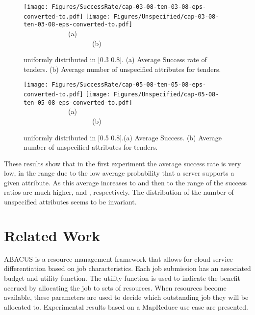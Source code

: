 \documentclass[10pt, conference, compsocconf]{IEEEtran}
\begin{document}
\begin{figure*}[p]
\begin{center}
\texttt{[image: Figures/SuccessRate/cap-03-08-ten-03-08-eps-converted-to.pdf]}
\texttt{[image: Figures/Unspecified/cap-03-08-ten-03-08-eps-converted-to.pdf]}\\
~~~~~~~~~~~~~(a)~~~~~~~~~~~~~~~~~~~~~~~~~~~~~~~~~~~~~~~~~~~~~~~~~~~~~~~~~~~~~~~~~(b)
\end{center}
\caption{ uniformly distributed in [0.3 0.8]. (a) Average Success rate of tenders. (b) Average number of unspecified attributes for tenders.}
\label{0308}
\end{figure*}



\begin{figure*}[p]
\begin{center}
\texttt{[image: Figures/SuccessRate/cap-05-08-ten-05-08-eps-converted-to.pdf]}
\texttt{[image: Figures/Unspecified/cap-05-08-ten-05-08-eps-converted-to.pdf]}\\
~~~~~~~~~~~~~(a)~~~~~~~~~~~~~~~~~~~~~~~~~~~~~~~~~~~~~~~~~~~~~~~~~~~~~~~~~~~~~~~~~(b)
\end{center}
\caption{ uniformly distributed in [0.5 0.8].(a) Average Success. (b) Average number of unspecified attributes for tenders.}
\label{0508}
\end{figure*}




These results show that in the first experiment the average success rate is very low, in the  range due to the low average probability  that a server supports a given attribute. As this average increases to  and then to  the range of the success ratios are much higher,  and , respectively. The distribution of the number of unspecified attributes seems to be invariant.


\section{Related Work}
\label{sec:related-work}

ABACUS \cite{zhang2013abacus} is a resource management framework that allows for cloud service differentiation based on job characteristics. Each job submission has an associated budget and utility function. The utility function is used to indicate the benefit accrued by allocating the job to sets of resources. When resources become available, these parameters are used to decide which outstanding job they will be allocated to. Experimental results based on a MapReduce use case are presented.
\end{document}
